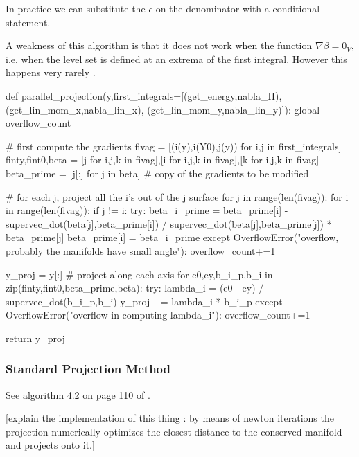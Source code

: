 \documentclass[12pt]{article}
\begin{document}
In practice we can substitute the $\epsilon$ on the denominator with a conditional statement. 

A weakness of this algorithm is that it does not work when the function $\nabla \beta=0_V$, i.e. when the level set is defined at an extrema of the first integral. However this happens very rarely . %

\begin{python}
def parallel_projection(y,first_integrals=[(get_energy,nabla_H),
                                            (get_lin_mom_x,nabla_lin_x),
                                            (get_lin_mom_y,nabla_lin_y)]):
    global overflow_count
    
    # first compute the gradients
    fivag = [(i(y),i(Y0),j(y)) for i,j in first_integrals]
    finty,fint0,beta = [j for i,j,k in fivag],[i for i,j,k in fivag],[k for i,j,k in fivag]
    beta_prime = [j[:] for j in beta] # copy of the gradients to be modified
    
    
    # for each j, project all the i's out of the j surface
    for j in range(len(fivag)):
        for i in range(len(fivag)):
            if j != i:
                try:
                    beta_i_prime = beta_prime[i] - supervec_dot(beta[j],beta_prime[i]) / supervec_dot(beta[j],beta_prime[j]) * beta_prime[j]
                    beta_prime[i] = beta_i_prime 
                except OverflowError("overflow, probably the manifolds have small angle"):
                    overflow_count+=1 
    
    y_proj = y[:] 
    # project along each axis
    for e0,ey,b_i_p,b_i in zip(finty,fint0,beta_prime,beta):
        try:
            lambda_i = (e0 - ey) / supervec_dot(b_i_p,b_i)
            y_proj += lambda_i * b_i_p 
        except OverflowError("overflow in computing lambda_i"):
            overflow_count+=1
            
    return y_proj
\end{python}

\subsubsection{Standard Projection Method}

See algorithm 4.2 on page 110 of \cite{Numerical}.

[explain the implementation of this thing : by means of newton iterations the projection numerically optimizes the closest distance to the conserved manifold and projects onto it.] 
\end{document}
